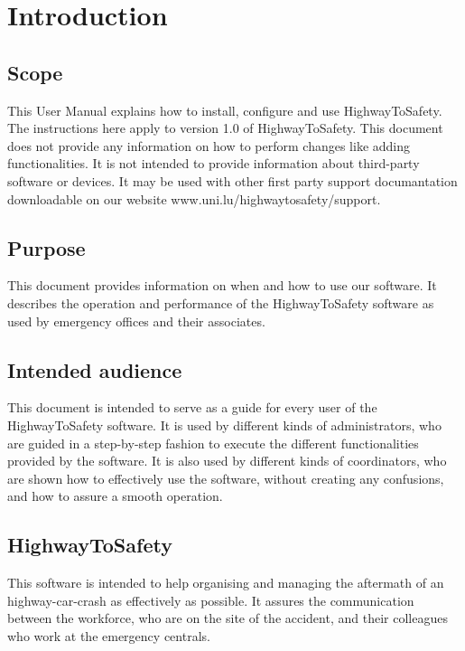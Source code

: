 \chapter{Introduction}
\label{chap:introduction}

\section{Scope}
This User Manual explains how to install, configure and use HighwayToSafety. The
instructions here apply to version 1.0 of HighwayToSafety.
This document does not provide any information on how to perform changes like
adding functionalities. It is not intended to provide information about
third-party software or devices.
It may be used with other first party support documantation
downloadable on our website www.uni.lu/highwaytosafety/support.
 
\section{Purpose}
This document provides information on when and how to use our software. It
describes the operation and performance of the HighwayToSafety software as used
by emergency offices and their associates.
\section{Intended audience}
This document is intended to serve as a guide for every user of the
HighwayToSafety software. It is used by different kinds of administrators, who
are guided in a step-by-step fashion to execute the different functionalities
provided by the software.
It is also used by different kinds of coordinators, who are shown how to
effectively use the software, without creating any confusions, and how to assure
a smooth operation.

\section{HighwayToSafety}
This software is intended to help organising and managing the
aftermath of an highway-car-crash as effectively as possible.
It assures the communication between the workforce, who are on the site of the
accident, and their colleagues who work at the emergency centrals. 


